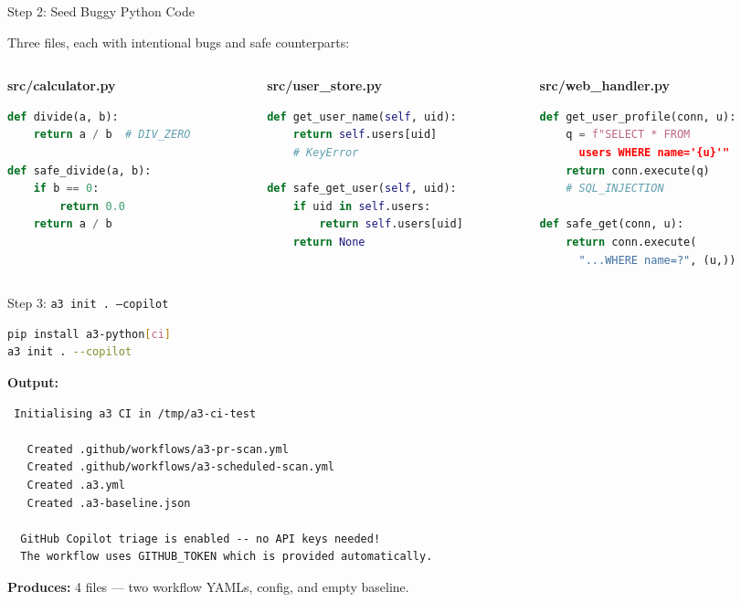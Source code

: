 \documentclass[aspectratio=169]{beamer}
\begin{document}
\begin{frame}[fragile]{Step 2: Seed Buggy Python Code}

Three files, each with intentional bugs and safe counterparts:

\begin{columns}[T]
\begin{column}{0.33\textwidth}
\textbf{src/calculator.py}
\begin{lstlisting}[language=Python]
def divide(a, b):
    return a / b  # DIV_ZERO

def safe_divide(a, b):
    if b == 0:
        return 0.0
    return a / b
\end{lstlisting}
\end{column}
\begin{column}{0.33\textwidth}
\textbf{src/user\_store.py}
\begin{lstlisting}[language=Python]
def get_user_name(self, uid):
    return self.users[uid]
    # KeyError

def safe_get_user(self, uid):
    if uid in self.users:
        return self.users[uid]
    return None
\end{lstlisting}
\end{column}
\begin{column}{0.33\textwidth}
\textbf{src/web\_handler.py}
\begin{lstlisting}[language=Python]
def get_user_profile(conn, u):
    q = f"SELECT * FROM
      users WHERE name='{u}'"
    return conn.execute(q)
    # SQL_INJECTION

def safe_get(conn, u):
    return conn.execute(
      "...WHERE name=?", (u,))
\end{lstlisting}
\end{column}
\end{columns}
\end{frame}

\begin{frame}[fragile]{Step 3: \texttt{a3 init .\ --copilot}}
\begin{lstlisting}[language=bash]
pip install a3-python[ci]
a3 init . --copilot
\end{lstlisting}

\textbf{Output:}
\begin{lstlisting}
 Initialising a3 CI in /tmp/a3-ci-test

   Created .github/workflows/a3-pr-scan.yml
   Created .github/workflows/a3-scheduled-scan.yml
   Created .a3.yml
   Created .a3-baseline.json

  GitHub Copilot triage is enabled -- no API keys needed!
  The workflow uses GITHUB_TOKEN which is provided automatically.
\end{lstlisting}

\textbf{Produces:} 4 files — two workflow YAMLs, config, and empty baseline.
\end{frame}
\end{document}
